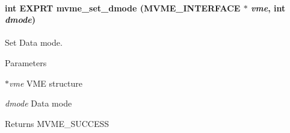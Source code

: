 \paragraph[{mvme\_\-set\_\-dmode}]{\setlength{\rightskip}{0pt plus 5cm}int EXPRT mvme\_\-set\_\-dmode ({\bf MVME\_\-INTERFACE} $\ast$ {\em vme}, \/  int {\em dmode})}\hfill\label{group__mvmestdfunctionh_gaaed1e33d2affe73c5afea1ce30b6c25b}
Set Data mode. 
\begin{DoxyParams}{Parameters}
\item[{\em $\ast$vme}]VME structure \item[{\em dmode}]Data mode \end{DoxyParams}
\begin{DoxyReturn}{Returns}
MVME\_\-SUCCESS 
\end{DoxyReturn}


